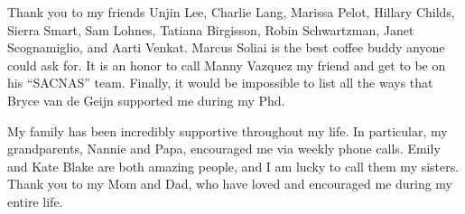 Thank you to my friends Unjin Lee, Charlie Lang, Marissa Pelot, Hillary Childs, Sierra Smart, Sam Lohnes, Tatiana Birgisson, Robin Schwartzman, Janet Scognamiglio, and Aarti Venkat. Marcus Soliai is the best coffee buddy anyone could ask for. It is an honor to call Manny Vazquez my friend and get to be on his ``SACNAS'' team. Finally, it would be impossible to list all the ways that Bryce van de Geijn supported me during my Phd. 


My family has been incredibly supportive throughout my life. In particular, my grandparents, Nannie and Papa, encouraged me via weekly phone calls. Emily and Kate Blake are both amazing people, and I am lucky to call them my sisters.  Thank you to my Mom and Dad, who have loved and encouraged me during my entire life. 